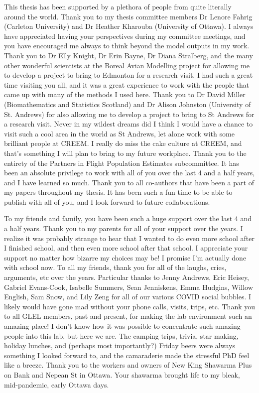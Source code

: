 \par This thesis has been supported by a plethora of people from quite literally around the world. 
Thank you to my thesis committee members Dr Lenore Fahrig (Carleton University) and Dr Heather Kharouba (University of Ottawa).
I always have appreciated having your perspectives during my committee meetings, and you have encouraged me always to think beyond the model outputs in my work.
Thank you to Dr Elly Knight, Dr Erin Bayne, Dr Diana Stralberg, and the many other wonderful scientists at the Boreal Avian Modelling project for allowing me to develop a project to bring to Edmonton for a research visit.
I had such a great time visiting you all, and it was a great experience to work with the people that came up with many of the methods I used here.
Thank you to Dr David Miller (Biomathematics and Statistics Scotland) and Dr Alison Johnston (University of St. Andrews) for also allowing me to develop a project to bring to St Andrews for a research visit.
Never in my wildest dreams did I think I would have a chance to visit such a cool area in the world as St Andrews, let alone work with some brilliant people at CREEM.
I really do miss the cake culture at CREEM, and that's something I will plan to bring to my future workplace.
Thank you to the entirety of the Partners in Flight Population Estimates subcommittee.
It has been an absolute privilege to work with all of you over the last 4 and a half years, and I have learned so much.
Thank you to all co-authors that have been a part of my papers throughout my thesis.
It has been such a fun time to be able to publish with all of you, and I look forward to future collaborations.

\par To my friends and family, you have been such a huge support over the last 4 and a half years.
Thank you to my parents for all of your support over the years.
I realize it was probably strange to hear that I wanted to do even more school after I finished school, and then even more school after that school.
I appreciate your support no matter how bizarre my choices may be!
I promise I'm actually done with school now.
To all my friends, thank you for all of the laughs, cries, arguments, etc over the years.
Particular thanks to Jenny Andrews, Eric Heisey, Gabriel Evans-Cook, Isabelle Summers, Sean Jenniskens, Emma Hudgins, Willow English, Sam Snow, and Lily Zeng for all of our various COVID social bubbles.
I likely would have gone mad without your phone calls, visits, trips, etc.
Thank you to all GLEL members, past and present, for making the lab environment such an amazing place!
I don't know how it was possible to concentrate such amazing people into this lab, but here we are.
The camping trips, trivia, star making, holiday lunches, and (perhaps most importantly?) Friday beers were always something I looked forward to, and the camaraderie made the stressful PhD feel like a breeze.
Thank you to the workers and owners of New King Shawarma Plus on Bank and Nepean St in Ottawa.
Your shawarma brought life to my bleak, mid-pandemic, early Ottawa days.

